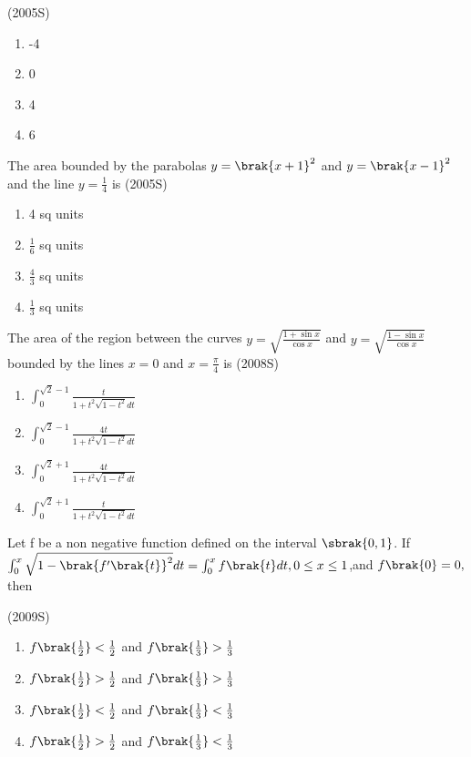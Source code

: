 	 \hfill(2005S)
\begin{enumerate}
 \item -4
 \item 0
 \item 4
 \item 6
\end{enumerate}
  \item The area bounded by the parabolas $y=\brak{x+1}^2$ and $y=\brak{x-1}^2$ and the line $y=\frac{1}{4}$ is
	  \hfill(2005S)
\begin{enumerate}
    \item 4 sq units
    \item $\frac{1}{6}$ sq units
    \item $\frac{4}{3}$ sq units
    \item $\frac{1}{3}$ sq units
\end{enumerate}
 \item The area of the region between the curves $y=\sqrt{\frac{1+\sin x}{\cos x}}$ and $y=\sqrt{\frac{1-\sin x}{\cos x}}$ bounded by the lines $x=0$ and $x=\frac{\pi}{4}$ is
	 \hfill(2008S)
\begin{enumerate}
    \item $\int_{0}^{\sqrt{2}-1}\frac{t}{1+t^{2}\sqrt{1-t^{2}}dt}$
       \item $\int_{0}^{\sqrt{2}-1}\frac{4t}{1+t^{2}\sqrt{1-t^{2}}dt}$
      \item $\int_{0}^{\sqrt{2}+1}\frac{4t}{1+t^{2}\sqrt{1-t^{2}}dt}$ 
         \item $\int_{0}^{\sqrt{2}+1}\frac{t}{1+t^{2}\sqrt{1-t^{2}}dt}$
\end{enumerate}
\item Let f be a non negative function defined on the interval $\sbrak{0,1}$. If $\int_{0}^{x}\sqrt{1-\brak{f'\brak{t}}^{2}}dt=\int_{0}^{x}f\brak{t}dt,0\leq{x}\leq1$,and $f\brak{0}=0,$ then

	\hfill(2009S)
\begin{enumerate}
    \item$ f\brak{\frac{1}{2}}<\frac{1}{2}$ and $f\brak{\frac{1}{3}}>\frac{1}{3}$
    \item$ f\brak{\frac{1}{2}}>\frac{1}{2}$ and $f\brak{\frac{1}{3}}>\frac{1}{3}$
  \item$ f\brak{\frac{1}{2}}<\frac{1}{2}$ and $f\brak{\frac{1}{3}}<\frac{1}{3}$
  \item$ f\brak{\frac{1}{2}}>\frac{1}{2}$ and $f\brak{\frac{1}{3}}<\frac{1}{3}$
\end{enumerate}


